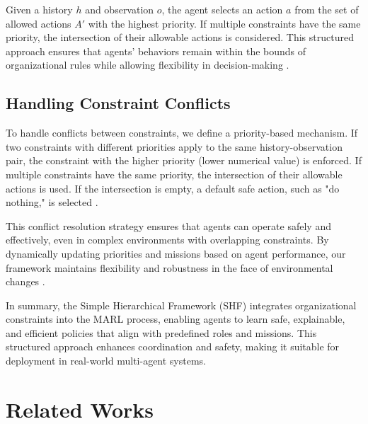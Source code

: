 \documentclass[sigconf,anonymous]{aamas}
\begin{document}

Given a history $h$ and observation $o$, the agent selects an action $a$ from the set of allowed actions $A'$ with the highest priority. If multiple constraints have the same priority, the intersection of their allowable actions is considered. This structured approach ensures that agents' behaviors remain within the bounds of organizational rules while allowing flexibility in decision-making \cite{hernandez2019survey, hubner2010moise}.

\subsection{Handling Constraint Conflicts}
To handle conflicts between constraints, we define a priority-based mechanism. If two constraints with different priorities apply to the same history-observation pair, the constraint with the higher priority (lower numerical value) is enforced. If multiple constraints have the same priority, the intersection of their allowable actions is used. If the intersection is empty, a default safe action, such as "do nothing," is selected \cite{hubner2010moise}.


This conflict resolution strategy ensures that agents can operate safely and effectively, even in complex environments with overlapping constraints. By dynamically updating priorities and missions based on agent performance, our framework maintains flexibility and robustness in the face of environmental changes \cite{wei2019safe, hubner2010moise}.

In summary, the Simple Hierarchical Framework (SHF) integrates organizational constraints into the MARL process, enabling agents to learn safe, explainable, and efficient policies that align with predefined roles and missions. This structured approach enhances coordination and safety, making it suitable for deployment in real-world multi-agent systems.


\section{Related Works}
\label{sec:related_works}
\end{document}
